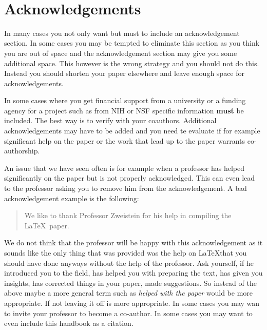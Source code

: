 \FILENAME\

\section{Acknowledgements}
\label{S:acknowledgements}

In many cases you not only want but must to include an acknowledgement
section. In some cases you may be tempted to eliminate this section as
you think you are out of space and the acknowledgement section may
give you some additional space. This however is the wrong strategy and
you should not do this. Instead you should shorten your paper
elsewhere and leave enough space for acknowledgements.

In some cases where you get financial support from a university or a
funding agency for a project such as from NIH or NSF specific
information {\bf must} be included. The best way is to verify with
your coauthors. Additional acknowledgements may have to be added and
you need te evaluate if for example significant help on the paper or
the work that lead up to the paper warrants co-authorship.

An issue that we have seen often is for example when a professor has
helped significantly on the paper but is not properly acknowledged.
This can even lead to the professor asking you to remove him from the
acknowledgement. A bad acknowledgement example is the following:

\begin{quote} 

  We like to thank Professor Zweistein for his help in
  compiling the \LaTeX~paper. 

\end{quote}

We do not think that the professor will be happy with this
acknowledgement as it sounds like the only thing that was provided was
the help on \LaTeX that you should have done anyways without the help
of the professor. Ask yourself, if he introduced you to the field, has
helped you with preparing the text, has given you insights, has
corrected things in your paper, made suggestions. So instead of the
above maybe a more general term such as \textit{helped with the paper}
would be more appropriate. If not leaving it off is more appropriate.
In some cases you may wan to invite your professor to become a
co-author. In some cases you may want to even include this handbook as
a citation.

